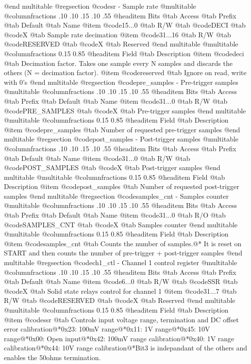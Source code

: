 @end multitable
@regsection @code{sr} - Sample rate
@multitable @columnfractions .10 .10 .15 .10 .55
@headitem Bits @tab Access @tab Prefix @tab Default @tab Name
@item @code{15...0}
@tab R/W @tab
@code{DECI}
@tab @code{X} @tab 
Sample rate decimation
@item @code{31...16}
@tab R/W @tab
@code{RESERVED}
@tab @code{X} @tab 
Reserved
@end multitable
@multitable @columnfractions 0.15 0.85
@headitem Field @tab Description
@item @code{deci} @tab Decimation factor. Takes one sample every N samples and discards the others (N = decimation factor).
@item @code{reserved} @tab Ignore on read, write with 0's
@end multitable
@regsection @code{pre_samples} - Pre-trigger samples
@multitable @columnfractions .10 .10 .15 .10 .55
@headitem Bits @tab Access @tab Prefix @tab Default @tab Name
@item @code{31...0}
@tab R/W @tab
@code{PRE_SAMPLES}
@tab @code{X} @tab 
Pre-trigger samples
@end multitable
@multitable @columnfractions 0.15 0.85
@headitem Field @tab Description
@item @code{pre_samples} @tab Number of requested pre-trigger samples
@end multitable
@regsection @code{post_samples} - Post-trigger samples
@multitable @columnfractions .10 .10 .15 .10 .55
@headitem Bits @tab Access @tab Prefix @tab Default @tab Name
@item @code{31...0}
@tab R/W @tab
@code{POST_SAMPLES}
@tab @code{X} @tab 
Post-trigger samples
@end multitable
@multitable @columnfractions 0.15 0.85
@headitem Field @tab Description
@item @code{post_samples} @tab Number of requested post-trigger samples
@end multitable
@regsection @code{samples_cnt} - Samples counter
@multitable @columnfractions .10 .10 .15 .10 .55
@headitem Bits @tab Access @tab Prefix @tab Default @tab Name
@item @code{31...0}
@tab R/O @tab
@code{SAMPLES_CNT}
@tab @code{X} @tab 
Samples counter
@end multitable
@multitable @columnfractions 0.15 0.85
@headitem Field @tab Description
@item @code{samples_cnt} @tab Counts the number of samples.@* It is reset on START and then counts the number of pre-trigger + post-trigger samples
@end multitable
@regsection @code{ch1_ctl} - Channel 1 control register
@multitable @columnfractions .10 .10 .15 .10 .55
@headitem Bits @tab Access @tab Prefix @tab Default @tab Name
@item @code{6...0}
@tab R/W @tab
@code{SSR}
@tab @code{X} @tab 
Solid state relays control for channel 1
@item @code{31...7}
@tab R/W @tab
@code{RESERVED}
@tab @code{X} @tab 
Reserved
@end multitable
@multitable @columnfractions 0.15 0.85
@headitem Field @tab Description
@item @code{ssr} @tab Controls input voltage range, termination and DC offset error calibration@*0x23: 100mV range@*0x11: 1V range@*0x45: 10V range@*0x00: Open input@*0x42: 100mV range calibration@*0x40: 1V range calibration@*0x44: 10V range calibration@*Bit3 is indepandant of the others and enables the 50ohms termination.
